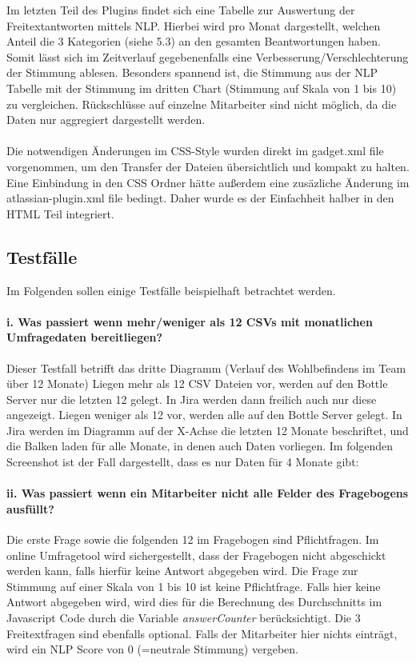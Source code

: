 \documentclass[a4paper,12pt,]{article}
\begin{document}
Im letzten Teil des Plugins findet sich eine Tabelle zur Auswertung der Freitextantworten mittels NLP. Hierbei wird pro Monat dargestellt, welchen Anteil die 3 Kategorien (siehe 5.3) an den gesamten Beantwortungen haben. Somit lässt sich im Zeitverlauf gegebenenfalls eine Verbesserung/Verschlechterung der Stimmung ablesen. Besonders spannend ist, die Stimmung aus der NLP Tabelle mit der Stimmung im dritten Chart (Stimmung auf Skala von 1 bis 10) zu vergleichen. Rückschlüsse auf einzelne Mitarbeiter sind nicht möglich, da die Daten nur aggregiert dargestellt werden.

\paragraph{}Die notwendigen Änderungen im CSS-Style wurden direkt im gadget.xml file vorgenommen, um den Transfer der Dateien übersichtlich und kompakt zu halten. Eine Einbindung in den CSS Ordner hätte außerdem eine zusäzliche Änderung im atlassian-plugin.xml file bedingt. Daher wurde es der Einfachheit halber in den HTML Teil integriert.

\subsection{Testfälle}
Im Folgenden sollen einige Testfälle beispielhaft betrachtet werden.
\paragraph{i. Was passiert wenn mehr/weniger als 12 CSVs mit monatlichen Umfragedaten bereitliegen?}
Dieser Testfall betrifft das dritte Diagramm (Verlauf des Wohlbefindens im Team über 12 Monate)
Liegen mehr als 12 CSV Dateien vor, werden auf den Bottle Server nur die letzten 12 gelegt. In Jira werden dann freilich auch nur diese angezeigt. 
Liegen weniger als 12 vor, werden alle auf den Bottle Server gelegt. In Jira werden im Diagramm auf der X-Achse die letzten 12 Monate beschriftet, und die Balken laden für alle Monate, in denen auch Daten vorliegen. Im folgenden Screenshot ist der Fall dargestellt, dass es nur Daten für 4 Monate gibt:

\paragraph{ii. Was passiert wenn ein Mitarbeiter nicht alle Felder des Fragebogens ausfüllt?}
Die erste Frage sowie die folgenden 12 im Fragebogen sind Pflichtfragen. Im online Umfragetool wird sichergestellt, dass der Fragebogen nicht abgeschickt werden kann, falls hierfür keine Antwort abgegeben wird.
Die Frage zur Stimmung auf einer Skala von 1 bis 10 ist keine Pflichtfrage. Falls hier keine Antwort abgegeben wird, wird dies für die Berechnung des Durchschnitts im Javascript Code durch die Variable \emph{answerCounter} berücksichtigt. 
Die 3 Freitextfragen sind ebenfalls optional. Falls der Mitarbeiter hier nichts einträgt, wird ein NLP Score von 0 (=neutrale Stimmung) vergeben.
\end{document}

